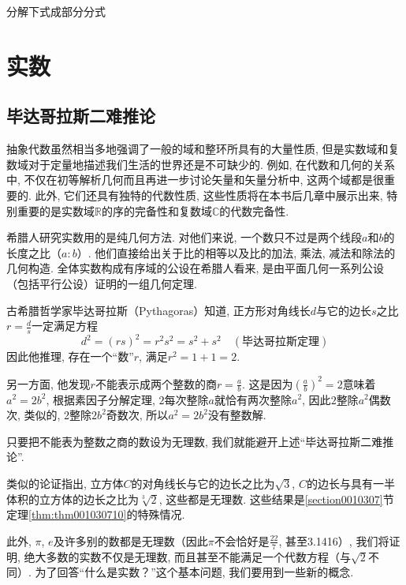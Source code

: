 \begin{problem}
分解下式成部分分式
\end{problem}


\chapter{实数}\label{section00104}

\section{毕达哥拉斯二难推论}\label{section0010401}
抽象代数虽然相当多地强调了一般的域和整环所具有的大量性质, 但是实数域和复数域对于定量地描述我们生活的世界还是不可缺少的. 例如, 在代数和几何的关系中, 不仅在初等解析几何而且再进一步讨论矢量和矢量分析中, 这两个域都是很重要的. 此外, 它们还具有独特的代数性质, 这些性质将在本书后几章中展示出来, 特别重要的是实数域$\mathbb{R}$的序的完备性和复数域$\mathbb{C}$的代数完备性. 

希腊人研究实数用的是纯几何方法. 对他们来说, 一个数只不过是两个线段$a$和$b$的长度之比（$a:b$）. 他们直接给出关于比的相等以及比的加法, 乘法, 减法和除法的几何构造. 全体实数构成有序域的公设在希腊人看来, 是由平面几何一系列公设（包括平行公设）证明的一组几何定理. 

古希腊哲学家毕达哥拉斯（Pythagoras）知道, 正方形对角线长$d$与它的边长$s$之比$r = \frac{d}{s}$一定满足方程
\begin{equation}\label{equ001040101}
d^2 = (rs)^2 = r^2s^2 = s^2 + s^2 \quad (\text{毕达哥拉斯定理})
\end{equation}
因此他推理, 存在一个“数”$r$, 满足$r^2 = 1 + 1 = 2$. 

另一方面, 他发现$r$不能表示成两个整数的商$r = \frac{a}{b}$. 这是因为$(\frac{a}{b})^2 = 2$意味着$a^2=2b^2$, 根据素因子分解定理, $2$每次整除$a$就恰有两次整除$a^2$, 因此$2$整除$a^2$偶数次, 类似的, 2整除$2b^2$奇数次, 所以$a^2=2b^2$没有整数解. 

只要把不能表为整数之商的数设为无理数, 我们就能避开上述“毕达哥拉斯二难推论”. 

类似的论证指出, 立方体$C$的对角线长与它的边长之比为$\sqrt{3}$, $C$的边长与具有一半体积的立方体的边长之比为$\sqrt[3]{2}$, 这些都是无理数. 这些结果是\ref{section0010307}节定理\ref{thm:thm001030710}的特殊情况. 

此外, $\pi$, $e$及许多别的数都是无理数（因此$\pi$不会恰好是$\frac{22}{7}$, 甚至3.1416）, 我们将证明, 绝大多数的实数不仅是无理数, 而且甚至不能满足一个代数方程（与$\sqrt{2}$不同）. 为了回答“什么是实数？”这个基本问题, 我们要用到一些新的概念. 

